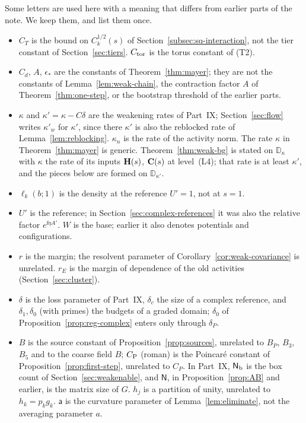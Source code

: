 \begin{remark}\label{rem:notation-flow}
Some letters are used here with a meaning that differs from earlier parts of the note. We keep them, and list them once.
\begin{itemize}
\item $C_T$ is the bound on $C_k^{1/2}(s)$ of Section~\ref{subsec:sq-interaction}, not the tier constant of Section~\ref{sec:tiers}. $C_{\rm tor}$ is the torus constant of (T2).
\item $C_d$, $A$, $\epsilon_*$ are the constants of Theorem~\ref{thm:mayer}; they are not the constants of Lemma~\ref{lem:weak-chain}, the contraction factor $A$ of Theorem~\ref{thm:one-step}, or the bootstrap threshold of the earlier parts.
\item $\kappa$ and $\kappa'=\kappa-C\delta$ are the weakening rates of Part~IX; Section~\ref{sec:flow} writes $\kappa'_w$ for $\kappa'$, since there $\kappa'$ is also the reblocked rate of Lemma~\ref{lem:reblocking}. $\kappa_n$ is the rate of the activity norm. The rate $\kappa$ in Theorem~\ref{thm:mayer} is generic. Theorem~\ref{thm:weak-bg} is stated on $\mathbb D_\kappa$ with $\kappa$ the rate of its inputs $\mathbf H(s)$, $\mathbf C(s)$ at level~(L4); that rate is at least $\kappa'$, and the pieces below are formed on $\mathbb D_{\kappa'}$.
\item $\ell_k(b;1)$ is the density at the reference $U'=1$, not at $s=1$.
\item $U'$ is the reference; in Section~\ref{sec:complex-references} it was also the relative factor $e^{\ii\eta A'}$. $W$ is the base; earlier it also denotes potentials and configurations.
\item $r$ is the margin; the resolvent parameter of Corollary~\ref{cor:weak-covariance} is unrelated. $r_E$ is the margin of dependence of the old activities (Section~\ref{sec:cluster}).
\item $\delta$ is the loss parameter of Part~IX, $\delta_c$ the size of a complex reference, and $\delta_1,\delta_0$ (with primes) the budgets of a graded domain; $\delta_0$ of Proposition~\ref{prop:reg-complex} enters only through $\delta_P$.
\item $B$ is the source constant of Proposition~\ref{prop:sources}, unrelated to $B_P$, $B_3$, $B_5$ and to the coarse field $B$; $C_{\rm P}$ (roman) is the Poincar\'e constant of Proposition~\ref{prop:first-step}, unrelated to $C_P$. In Part~IX, $\mathsf N_{\rm b}$ is the box count of Section~\ref{sec:weakenable}, and $\mathsf N$, in Proposition~\ref{prop:AB} and earlier, is the matrix size of $G$. $h_j$ is a partition of unity, unrelated to $h_k=p_kg_k$. $\mathsf a$ is the curvature parameter of Lemma~\ref{lem:eliminate}, not the averaging parameter $a$.

\end{itemize}
\end{remark}
